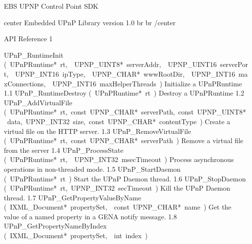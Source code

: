 \documentclass{article}
\begin{document}
\pagebreak
\sloppy
\cxxTitle{}
        {EBS UPNP Control Point SDK}
        {}
        {}
        {}
\begin{cxxContents}
\begin{cxxContents}
\end{cxxContents}
\end{cxxContents}
\clearpage\pagebreak
\begin{cxxdoc}
\<center\>
Embedded UPnP Library version 1.0 \<br\>
\<br\>
\</center\>
\end{cxxdoc}
\begin{cxxentry}
{}
        {API Reference }
        {}
        {}
        {1}
\begin{cxxnames}
        {UPnP\_RuntimeInit}
        {(\ UPnPRuntime*\ rt,\ \ UPNP\_UINT8*\ serverAddr,\ \ UPNP\_UINT16\ serverPort,\ \ UPNP\_INT16\ ipType,\ \ UPNP\_CHAR*\ wwwRootDir,\ \ UPNP\_INT16\ maxConnections,\ \ UPNP\_INT16\ maxHelperThreads\ )}
        {Initialize a UPnPRuntime }
        {1.1}
        {UPnP\_RuntimeDestroy}
        {(\ UPnPRuntime*\ rt\ )}
        {Destroy a UPnPRuntime }
        {1.2}
        {UPnP\_AddVirtualFile}
        {(\ UPnPRuntime*\ rt,\ const\ UPNP\_CHAR*\ serverPath,\ const\ UPNP\_UINT8*\ data,\ UPNP\_INT32\ size,\ const\ UPNP\_CHAR*\ contentType\ )}
        {Create a virtual file on the HTTP server. }
        {1.3}
        {UPnP\_RemoveVirtualFile}
        {(\ UPnPRuntime*\ rt,\ const\ UPNP\_CHAR*\ serverPath\ )}
        {Remove a virtual file from the server }
        {1.4}
        {UPnP\_ProcessState}
        {(\ UPnPRuntime*\ rt,\ \ UPNP\_INT32\ msecTimeout\ )}
        {Process asynchronous operations in non-threaded mode. }
        {1.5}
        {UPnP\_StartDaemon}
        {(\ UPnPRuntime*\ rt\ )}
        {Start the UPnP Daemon thread. }
        {1.6}
        {UPnP\_StopDaemon}
        {(\ UPnPRuntime*\ rt,\ UPNP\_INT32\ secTimeout\ )}
        {Kill the UPnP Daemon thread. }
        {1.7}
        {UPnP\_GetPropertyValueByName}
        {(\ IXML\_Document*\ propertySet,\ \ const\ UPNP\_CHAR*\ name\ )}
        {Get the value of a named property in a GENA notify message. }
        {1.8}
        {UPnP\_GetPropertyNameByIndex}
        {(\ IXML\_Document*\ propertySet,\ \ int\ index\ )}

\end{cxxnames}
\end{cxxentry}
\end{document}
